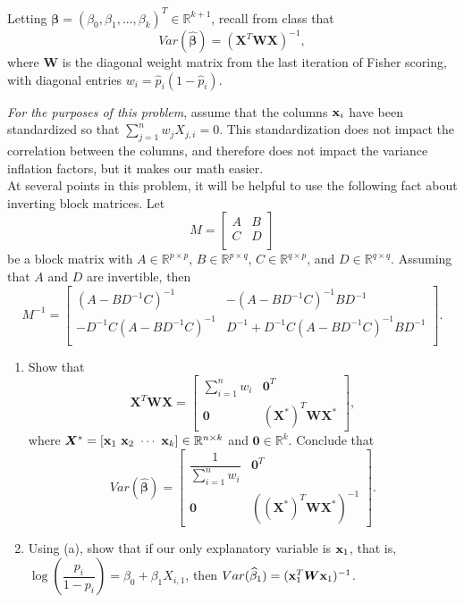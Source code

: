 \documentclass[11pt]{article}
\begin{document}
\begin{enumerate}
Letting $\bm{\beta} = (\beta_0, \beta_1,...,\beta_k)^T \in \mathbb{R}^{k + 1}$, recall from class that
$$Var(\widehat{\bm{\beta}}) = (\bm{X}^T \bm{W} \bm{X})^{-1},$$
where $\bm{W}$ is the diagonal weight matrix from the last iteration of Fisher scoring, with diagonal entries $w_i = \widehat{p}_i (1 - \widehat{p}_i)$.

\textit{For the purposes of this problem}, assume that the columns ${\bf x}_i$ have been standardized so that $\sum \limits_{j=1}^n w_j X_{j,i} = 0$. This standardization does not impact the correlation between the columns, and therefore does not impact the variance inflation factors, but it makes our math easier.\\

At several points in this problem, it will be helpful to use the following fact about inverting block matrices. Let 
$$M = \begin{bmatrix}
A & B \\
C & D\\
\end{bmatrix}$$
be a block matrix with $A \in \mathbb{R}^{p \times p}$, $B \in \mathbb{R}^{p \times q}$, $C \in \mathbb{R}^{q \times p}$, and $D \in \mathbb{R}^{q \times q}$. Assuming that $A$ and $D$ are invertible, then
$$M^{-1} = \begin{bmatrix}
(A - BD^{-1}C)^{-1} & -(A - BD^{-1}C)^{-1}BD^{-1} \\
-D^{-1}C(A - BD^{-1}C)^{-1} & D^{-1} + D^{-1}C(A - BD^{-1}C)^{-1}BD^{-1}\\
\end{bmatrix}.$$

\newpage

\begin{enumerate}
\item Show that
$$\bm{X}^T \bm{W} \bm{X} = \begin{bmatrix}
\sum \limits_{i=1}^n w_i & \bm{0}^T \\
\bm{0} & (\bm{X}^*)^T \bm{W} \bm{X}^*
\end{bmatrix},$$
where $\bm{X}^* = [{\bf x}_1 \ {\bf x}_2 \ \cdots \ {\bf x}_k] \in \mathbb{R}^{n \times k}$ and $\bm{0} \in \mathbb{R}^k$. Conclude that 
$$Var(\widehat{\bm{\beta}}) = \begin{bmatrix}
\dfrac{1}{\sum \limits_{i=1}^n w_i} & \bm{0}^T \\
\bm{0} & ((\bm{X}^*)^T \bm{W} \bm{X}^*)^{-1}
\end{bmatrix}.$$

\item Using (a), show that if our only explanatory variable is ${\bf x}_1$, that is, $\log \left( \dfrac{p_i}{1 - p_i} \right) = \beta_0 + \beta_1 X_{i,1}$, then $Var(\widehat{\beta}_1) = ({\bf x}_1^T \bm{W} {\bf x}_1)^{-1}$.


\end{enumerate}
\end{enumerate}
\end{document}
